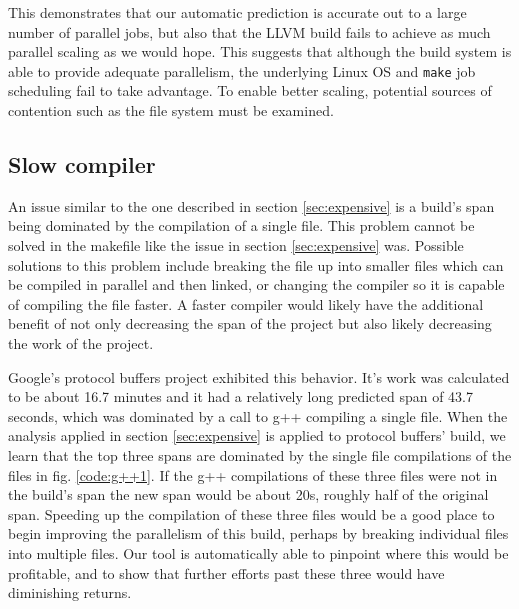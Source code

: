 \documentclass[sigconf,10pt,authorversion]{acmart}\settopmatter{printfolios=true,printccs=false,printacmref=false}
\begin{document}
This demonstrates that our automatic prediction is accurate out to a
large number of parallel jobs, but also that the LLVM build fails to
achieve as much parallel scaling as we would hope. This suggests that
although the build system is able to provide adequate parallelism, the
underlying Linux OS and \verb|make| job scheduling fail to take
advantage. To enable better scaling, potential sources of contention
such as the file system must be examined.




\subsection{Slow compiler}
\label{sec:compiler}

An issue similar to the one described in section \ref{sec:expensive} is a build's
span being dominated by the compilation of a single file.  This problem cannot be
solved in the makefile like the issue in section \ref{sec:expensive} was.
Possible solutions to this problem include
breaking the file up into smaller files which can be compiled in parallel and then
linked, or changing the compiler so it is capable of compiling the file faster.
A faster compiler would likely have the additional benefit of not only decreasing the span
of the project but also likely decreasing the work of the project.

Google's protocol buffers project \cite{protobufs3.6.1} exhibited this
behavior.  It's work was calculated to be about 16.7 minutes and it
had a relatively long predicted span of 43.7 seconds, which was
dominated by a call to g++ compiling a single file.  When the analysis
applied in section \ref{sec:expensive} is applied to protocol buffers'
build, we learn that the top three spans are dominated by the single
file compilations of the files in fig. \ref{code:g++1}.  If the g++
compilations of these three files were not in the build's span the new
span would be about 20s, roughly half of the original span.  Speeding
up the compilation of these three files would be a good place to begin
improving the parallelism of this build, perhaps by breaking
individual files into multiple files. Our tool is automatically able
to pinpoint where this would be profitable, and to show that further
efforts past these three would have diminishing returns.
\end{document}
